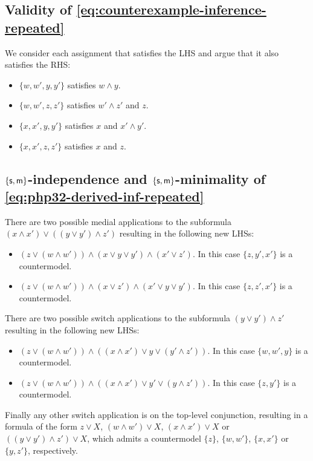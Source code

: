 \documentclass[a4paper, UKenglish, cleveref]{lipics-v2019}
\begin{document}
\subsection{Validity of \cref{eq:counterexample-inference-repeated}}
\label{sec:app:validity-counterexample-inference}
We consider each assignment that satisfies the LHS and argue that it also satisfies the RHS:
\begin{itemize}
\item $\{w,w',y,y' \}$ satisfies $w\land y$.
\item $\{w,w',z,z' \}$ satisfies $w' \land z' $ and $z$.
\item $\{ x,x',y,y' \}$ satisfies $x$ and $x' \land y' $.
\item $\{x,x',z,z' \}$ satisfies $x$ and $z$.
\end{itemize}

\subsection{$\{\mathsf{s},\mathsf{m}\}$-independence and $\{\mathsf{s},\mathsf{m}\}$-minimality of \cref{eq:php32-derived-inf-repeated}}
\label{sec:ind-min-php32}

There are two possible medial applications to the subformula $(x \land x') \lor ((y \lor y') \land z')$ resulting in the following new LHSs:
\begin{itemize}
\item $(z \lor (w \land w')) \land (x \lor y \lor y') \land (x' \lor z')$. In this case $\{z, y', x'\}$ is a countermodel.
\item $(z \lor (w \land w')) \land (x \lor z') \land (x' \lor y \lor y')$. In this case $\{z, z', x'\}$ is a countermodel.
\end{itemize}

There are two possible switch applications to the subformula $(y \lor y') \land z'$ resulting in the following new LHSs:
\begin{itemize}
\item $(z \lor (w \land w')) \land ((x \land x') \lor y \lor (y' \land z'))$. In this case $\{w ,w',y\}$ is a countermodel.
\item $(z \lor (w \land w')) \land ((x \land x') \lor y' \lor (y \land z'))$. In this case $\{z, y'\}$ is a countermodel.
\end{itemize}

Finally any other switch application is on the top-level conjunction, resulting in a formula of the form $z \lor X$, $(w \land w') \lor X$, $(x \land x') \lor X$ or $((y \lor y') \land z') \lor X$, which admits a countermodel $\{z\}$, $\{w, w'\}$, $\{x, x'\}$ or $\{y ,z'\}$, respectively.
\end{document}
